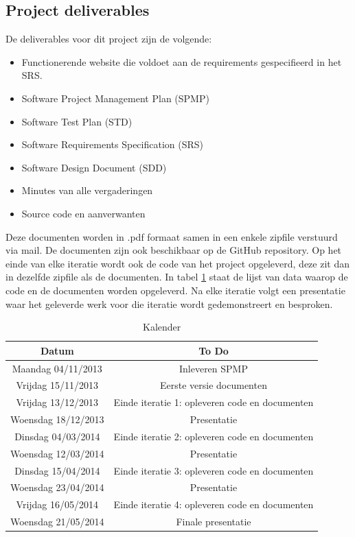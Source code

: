 \subsection{Project deliverables}
De deliverables voor dit project zijn de volgende:
\begin{itemize}
	\item Functionerende website die voldoet aan de requirements gespecifieerd in het SRS.
	\item Software Project Management Plan (SPMP)
	\item Software Test Plan (STD)
	\item Software Requirements Specification (SRS)
	\item Software Design Document (SDD)
	\item Minutes van alle vergaderingen
	\item Source code en aanverwanten
\end{itemize}
Deze documenten worden in .pdf formaat samen in een enkele zipfile verstuurd via mail. De documenten zijn ook beschikbaar op de GitHub repository. Op het einde van elke iteratie wordt ook de code van het project opgeleverd, deze zit dan in dezelfde zipfile als de documenten. In tabel \ref{tab:kalender} staat de lijst van data waarop de code en de documenten worden opgeleverd. Na elke iteratie volgt een presentatie waar het geleverde werk voor die iteratie wordt gedemonstreert en besproken. 
\begin{table}[H]
  \centering
  \caption{Kalender}
    \begin{tabular}{c|c}
    \textbf{Datum} & \textbf{To Do} \\
    \hline
    Maandag 04/11/2013 & Inleveren SPMP \\
    Vrijdag 15/11/2013 & Eerste versie documenten \\
    Vrijdag 13/12/2013 & Einde iteratie 1: opleveren code en documenten \\
    Woensdag 18/12/2013 & Presentatie \\
    \hline
    \hline
    Dinsdag 04/03/2014 & Einde iteratie 2: opleveren code en documenten \\
    Woensdag 12/03/2014 & Presentatie \\
    Dinsdag 15/04/2014 & Einde iteratie 3: opleveren code en documenten \\
    Woensdag 23/04/2014 & Presentatie \\
    Vrijdag 16/05/2014 & Einde iteratie 4: opleveren code en documenten \\
    Woensdag 21/05/2014 & Finale presentatie \\
    \end{tabular}
  \label{tab:kalender}
\end{table}

